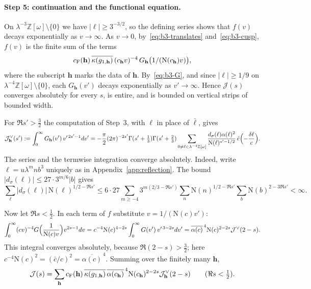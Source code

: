 \documentclass[11pt]{article}
\numberwithin{equation}{section}
\newcommand{\OO}{\mathbb Z[\omega]}
\newcommand{\N}{\mathrm N}
\newcommand{\ce}{\check e}
\begin{document}
\paragraph{Step 5: continuation and the functional equation.} On
$\lambda^{-3}\OO\setminus\{0\}$ we have $|\ell|\ge3^{-3/2}$, so the
defining series shows that $f(v)$ decays exponentially as $v\to\infty$.
As $v\to0$, by~\eqref{eq:b3-translates} and~\eqref{eq:b3-cusp}, $f(v)$
is the finite sum of the terms
\begin{equation}\label{eq:d113}
 c_{\rm F}(\mathbf h)\,\overline{\kappa(g_{1,\mathbf h})}\,
 (c_{\mathbf h}v)^{-4}\,G_{\mathbf h}\bigl(1/(\N(c_{\mathbf h})v)\bigr),
\end{equation}
where the subscript $\mathbf h$ marks the data of $\mathbf h$.
By~\eqref{eq:b3-G}, and since $|\ell|\ge1/9$ on
$\lambda^{-4}\OO\setminus\{0\}$, each $G_{\mathbf h}(v')$ decays
exponentially as $v'\to\infty$. Hence $\mathcal J(s)$ converges
absolutely for every $s$, is entire, and is bounded on vertical strips
of bounded width.

For $\Re s'>\frac32$ the computation of Step~3, with $\ell$ in place of
$\bar\ell$, gives
\begin{equation}\label{eq:b3-dual}
 \mathcal J^\vee_{\mathbf h}(s'):=\int_0^\infty G_{\mathbf h}(v')\,
 v'^{\,2s'-1}dv'
 =-\frac\pi2(2\pi)^{-2s'}\Gamma(s'+\tfrac13)\Gamma(s'+\tfrac23)
 \sum_{0\ne\ell\in\lambda^{-4}\OO}\frac{d_\sigma(\ell)\alpha(\ell)^2}
 {\N(\ell)^{s'-1/2}}\,\ce\Bigl(-\frac{\delta\ell}c\Bigr).
\end{equation}
The series and the termwise integration converge absolutely. Indeed,
write $\ell=u\lambda^mnb^3$ uniquely as in Appendix~\ref{app:reflection}.
The bound $|d_\sigma(\ell)|\le27\cdot3^{m/6}|b|$ gives
\begin{equation}\label{eq:d114}
 \sum_{\ell}|d_\sigma(\ell)|\,\N(\ell)^{1/2-\Re s'}
 \le6\cdot27\sum_{m\ge-4}3^{m(2/3-\Re s')}\sum_n\N(n)^{1/2-\Re s'}
 \sum_b\N(b)^{2-3\Re s'}<\infty .
\end{equation}

Now let $\Re s<\frac12$. In each term of $f$ substitute
$v=1/(\N(c)v')$:
\begin{equation}\label{eq:d115}
 \int_0^\infty(cv)^{-4}G\Bigl(\frac1{\N(c)v}\Bigr)v^{2s-1}dv
 =c^{-4}\N(c)^{4-2s}\int_0^\infty G(v')\,v'^{\,3-2s}dv'
 =\overline{\alpha(c)}^{\,4}\N(c)^{2-2s}\mathcal J^\vee(2-s).
\end{equation}
This integral converges absolutely, because $\Re(2-s)>\frac32$; here
$c^{-4}\N(c)^2=(\bar c/c)^2=\overline{\alpha(c)}^{\,4}$. Summing over
the finitely many $\mathbf h$,
\begin{equation}\label{eq:b3-fe}
 \mathcal J(s)=\sum_{\mathbf h}c_{\rm F}(\mathbf h)\,
 \overline{\kappa(g_{1,\mathbf h})}\,\overline{\alpha(c_{\mathbf h})}^{\,4}
 \N(c_{\mathbf h})^{2-2s}\mathcal J^\vee_{\mathbf h}(2-s)
 \qquad(\Re s<\tfrac12).
\end{equation}
\end{document}
